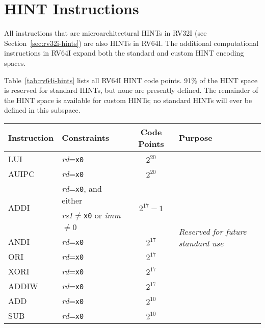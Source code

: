 \section{HINT Instructions}
\label{sec:rv64i-hints}

All instructions that are microarchitectural HINTs in RV32I (see
Section~\ref{sec:rv32i-hints}) are also HINTs in RV64I.  The
additional computational instructions in RV64I expand both the standard and
custom HINT encoding spaces.

Table~\ref{tab:rv64i-hints} lists all RV64I HINT code points.  91\% of the HINT
space is reserved for standard HINTs, but none are presently defined.  The
remainder of the HINT space is available for custom HINTs; no standard HINTs
will ever be defined in this subspace.

\begin{table}[hbt]
\centering
\begin{tabular}{|l|l|c|l|}
  \hline
  Instruction           & Constraints                                 & Code Points & Purpose \\ \hline \hline
  LUI                   & {\em rd}={\tt x0}                           & $2^{20}$                    & \multirow{21}{*}{\em Reserved for future standard use} \\ \cline{1-3}
  AUIPC                 & {\em rd}={\tt x0}                           & $2^{20}$                    & \\ \cline{1-3}
  \multirow{2}{*}{ADDI} & {\em rd}={\tt x0}, and either               & \multirow{2}{*}{$2^{17}-1$} & \\
                        & {\em rs1}$\neq${\tt x0} or {\em imm}$\neq$0 &                             & \\ \cline{1-3}
  ANDI                  & {\em rd}={\tt x0}                           & $2^{17}$                    & \\ \cline{1-3}
  ORI                   & {\em rd}={\tt x0}                           & $2^{17}$                    & \\ \cline{1-3}
  XORI                  & {\em rd}={\tt x0}                           & $2^{17}$                    & \\ \cline{1-3}
  ADDIW                 & {\em rd}={\tt x0}                           & $2^{17}$                    & \\ \cline{1-3}
  ADD                   & {\em rd}={\tt x0}                           & $2^{10}$                    & \\ \cline{1-3}
  SUB                   & {\em rd}={\tt x0}                           & $2^{10}$                    & \\ \cline{1-3}

\end{tabular}
\end{table}
